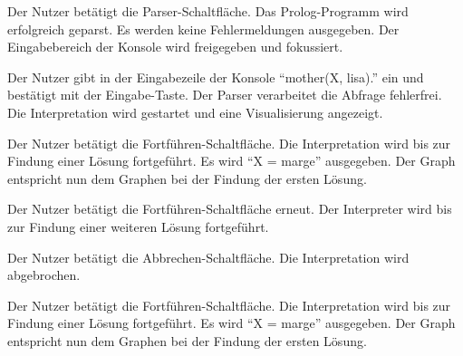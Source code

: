 \documentclass[parskip=full,11pt,twoside]{scrartcl}
\begin{document}
{Der Nutzer betätigt die Parser-Schaltfläche.}
{Das Prolog-Programm wird erfolgreich geparst. Es werden keine Fehlermeldungen ausgegeben. Der Eingabebereich der Konsole wird freigegeben und fokussiert.}

{Der Nutzer gibt in der Eingabezeile der Konsole \enquote{mother(X, lisa).} ein und bestätigt mit der Eingabe-Taste.}
{Der Parser verarbeitet die Abfrage fehlerfrei. Die Interpretation wird gestartet und eine Visualisierung angezeigt.}

{Der Nutzer betätigt die Fortführen-Schaltfläche.}
{Die Interpretation wird bis zur Findung einer Lösung fortgeführt. Es wird \enquote{X = marge} ausgegeben. Der Graph entspricht nun dem Graphen bei der Findung der ersten Lösung.}

{Der Nutzer betätigt die Fortführen-Schaltfläche erneut.}
{Der Interpreter wird bis zur Findung einer weiteren Lösung fortgeführt.}

{Der Nutzer betätigt die Abbrechen-Schaltfläche.}
{Die Interpretation wird abgebrochen.}



{Der Nutzer betätigt die Fortführen-Schaltfläche.}
{Die Interpretation wird bis zur Findung einer Lösung fortgeführt. Es wird \enquote{X = marge} ausgegeben. Der Graph entspricht nun dem Graphen bei der Findung der ersten Lösung.}
\end{document}
